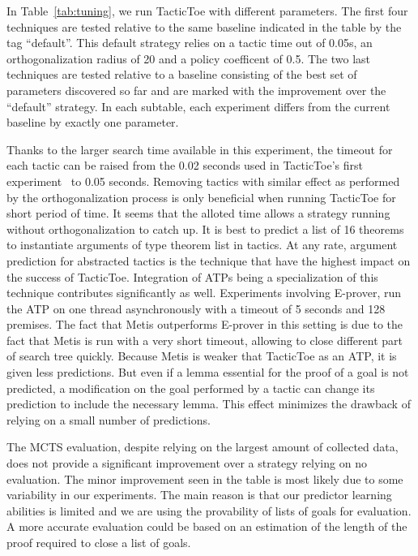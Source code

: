 \documentclass[runningheads,a4paper,draft]{svjour3}
\def\eprover{\textsf{E-prover}\xspace}
\def\metis{\textsf{Metis}\xspace}
\def\tactictoe{\textsf{TacticToe}\xspace}
\begin{document}
In Table~\ref{tab:tuning}, we run \tactictoe with different parameters.
The first four techniques are tested relative to the same baseline indicated in
the table by the tag ``default''.  This default strategy relies on a tactic
time out of 0.05s, an orthogonalization radius of 20 and a policy coefficent of
0.5.
The two last techniques are tested relative
to a baseline consisting of the best set of parameters discovered so far and
are marked with the improvement over the ``default'' strategy.
In each subtable, each experiment differs from the current baseline by exactly
one parameter.

Thanks to the larger search time available in this experiment, the timeout for
each tactic can be raised from the 0.02 seconds used in \tactictoe's first
experiment~\cite{tgckju-lpar17} to 0.05
seconds. Removing tactics with similar effect as performed by the
orthogonalization process is only beneficial when running \tactictoe for short
period of time. It seems that the alloted time allows a strategy
running without orthogonalization to catch up.
It is best to predict a list of 16 theorems to instantiate arguments of type
theorem list in tactics. At any rate, argument prediction for abstracted
tactics is the technique that have the highest impact on the success of
\tactictoe. Integration of ATPs being a specialization of this technique
contributes significantly as well. Experiments involving \eprover, run the ATP
on one thread asynchronously with a timeout of 5 seconds and 128 premises.
The fact that \metis outperforms \eprover in this setting is due to the fact
that \metis is run with a very short timeout, allowing to close different part
of search tree quickly. Because \metis is weaker that \tactictoe as an ATP, it
is given less predictions. But even if a lemma essential for the proof of a
goal is not predicted, a modification on the goal performed by a tactic can
change its prediction to include the necessary lemma.
This effect minimizes the drawback of relying on a small number of predictions.


The MCTS evaluation, despite relying on the largest amount of collected data,
does not provide a significant improvement over a strategy relying on no
evaluation. The minor improvement seen in the table is most likely due to some 
variability in our experiments.
The main reason is that our predictor learning abilities is
limited and we are using the provability of lists of goals for evaluation. A 
more accurate evaluation could be based on an estimation of the length of the 
proof required to close a list of goals.
\end{document}
